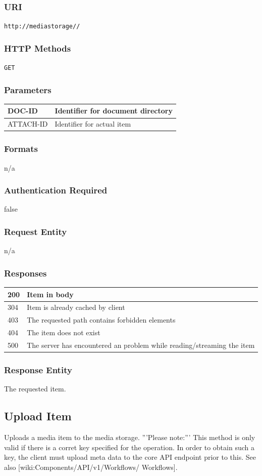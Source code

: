 \documentclass[10pt]{article}
\begin{document}
\subsubsection{URI}
\texttt{http://mediastorage//
}\subsubsection{HTTP Methods}
\texttt{GET}
\subsubsection{Parameters}
\begin{tabular}{|l|l|}\hline
DOC-ID & Identifier for document directory \\
\hline
ATTACH-ID & Identifier for actual item \\
\hline
\end{tabular}
\subsubsection{Formats}
n/a
\subsubsection{Authentication Required}
false
\subsubsection{Request Entity}
n/a
\subsubsection{Responses}
\begin{tabular}{|l|l|}\hline
200 & Item in body \\
\hline
304 & Item is already cached by client \\
\hline
403 & The requested path contains forbidden elements \\
\hline
404 & The item does not exist \\
\hline
500 & The server has encountered an problem while reading/streaming the item \\
\hline
\end{tabular}
\subsubsection{Response Entity}
The requested item.
\subsection{Upload Item}
Uploads a media item to the media storage. 
'''Please note:''' This method is only valid if there is a corret key specified for the operation. In order to obtain such a key, the client must upload meta data to the core API endpoint prior to this. See also [wiki:Components/API/v1/Workflows/ Workflows].
\end{document}
